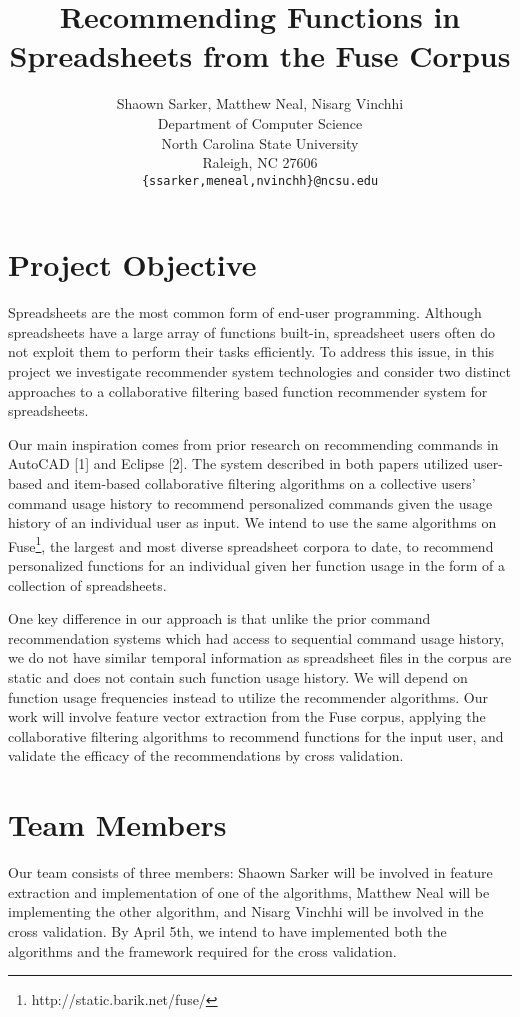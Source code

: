 \documentclass{article} %
\title{Recommending Functions in Spreadsheets from the Fuse Corpus}
\author{
Shaown Sarker, Matthew Neal, Nisarg Vinchhi\\
Department of Computer Science\\
North Carolina State University\\
Raleigh, NC 27606 \\
\texttt{\{ssarker,meneal,nvinchh\}@ncsu.edu}
}
\begin{document}
\maketitle

\thispagestyle{empty}

\section*{Project Objective}
Spreadsheets are the most common form of end-user programming. Although 
spreadsheets have a large array of functions built-in, spreadsheet users often 
do not exploit them to perform their tasks efficiently. To address this issue, 
in this project we investigate recommender system technologies and consider two 
distinct approaches to a collaborative filtering based function recommender 
system for spreadsheets.

Our main inspiration comes from prior research on recommending commands in 
AutoCAD [1] and Eclipse [2]. The system described in both papers utilized 
user-based and item-based collaborative filtering algorithms on a collective 
users' command usage history to recommend personalized commands given the usage 
history of an individual user as input. We intend to use the same algorithms on
Fuse\footnote{http://static.barik.net/fuse/}, the largest and most diverse 
spreadsheet corpora to date, to recommend personalized functions for an 
individual given her function usage in the form of a collection of spreadsheets.

One key difference in our approach is that unlike the prior command 
recommendation systems which had access to sequential command usage history, we
do not have similar temporal information as spreadsheet files in the corpus are
static and does not contain such function usage history. We will depend on 
function usage frequencies instead to utilize the recommender algorithms. Our
work will involve feature vector extraction from the Fuse corpus, applying the
collaborative filtering algorithms to recommend functions for the input user,
and validate the efficacy of the recommendations by cross validation.

\section*{Team Members}
Our team consists of three members: Shaown Sarker will be involved in feature
extraction and implementation of one of the algorithms, Matthew Neal will be
implementing the other algorithm, and Nisarg Vinchhi will be involved in the 
cross validation. By April 5th, we intend to have implemented both the 
algorithms and the framework required for the cross validation.
\end{document}
